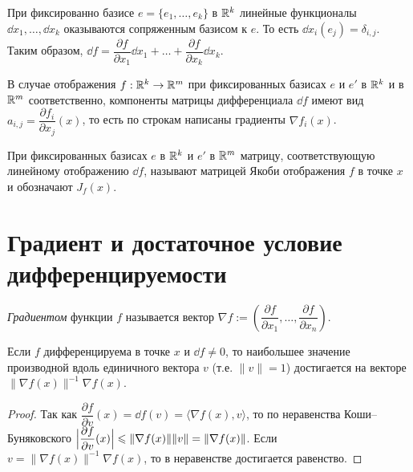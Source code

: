 \documentclass[a4paper]{article}
\theoremstyle{named}
\begin{document}
    \begin{remark*}
        При фиксированно базисе $e = \{e_1, \dots, e_k\}$ в $\RR^k$ линейные функционалы $\dd x_1, \dots, \dd x_k$ оказываются сопряженным базисом к $e$. То есть $\dd x_i(e_j) = \delta_{i, j}$. Таким образом, $\dd f = \dfrac{\partial f}{\partial x_1}\dd x_1 + \dots + \dfrac{\partial f}{\partial x_k}\dd x_k$.
    \end{remark*}

    \begin{remark*}
        В случае отображения $f: \RR^k \to \RR^m$ при фиксированных базисах $e$ и $e'$ в $\RR^k$ и в $\RR^m$ соответственно, компоненты матрицы дифференциала $\dd f$ имеют вид $a_{i, j} = \dfrac{\partial f_i}{\partial x_j}(x)$, то есть по строкам написаны градиенты $\nabla f_i(x)$.
    \end{remark*}

    \begin{definition*}
        При фиксированных базисах $e$ в $\RR^k$ и $e'$ в $\RR^m$ матрицу, соответствующую линейному отображению $\dd f$, называют матрицей Якоби отображения $f$ в точке $x$ и обозначают $J_f(x)$.
    \end{definition*}

    \section{Градиент и достаточное условие дифференцируемости}

    \begin{definition*}
        {\it Градиентом} функции $f$ называется вектор
        $\nabla f:=\left(\dfrac{\partial f}{\partial x_1},\ldots,\dfrac{\partial f}{\partial x_n}\right)$.
    \end{definition*}

    \begin{lemma*}
        Если $f$ дифференцируема в точке $x$ и $\dd f\ne0$, то наибольшее значение производной вдоль единичного вектора
        $v$ (т.е. $\|v\|=1$) достигается на векторе $\|\nabla f(x)\|^{-1}\nabla f(x)$.
    \end{lemma*}

    \begin{proof}
        Так как $\dfrac{\partial f}{\partial v}(x) = \dd f(v) = \langle\nabla f(x), v\rangle$,
        то по неравенства Коши--Буняковского $\Bigl|\dfrac{\partial f}{\partial v}(x)\Bigr|\leq \|\nabla f(x)\|\|v\|
        =\|\nabla f(x)\|$. Если $v=\|\nabla f(x)\|^{-1}\nabla f(x)$, то в неравенстве достигается равенство.
    \end{proof}
\end{document}
